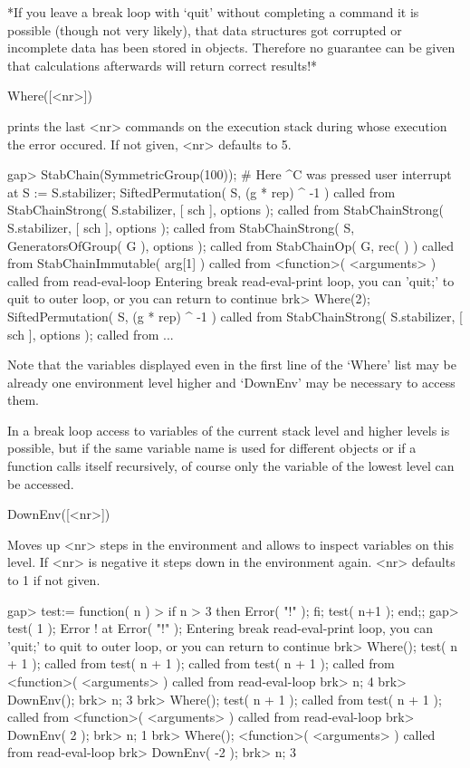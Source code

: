*If you leave a break loop with `quit' without completing a command it
is possible (though not very likely), that data structures got corrupted
or incomplete data has been stored in objects. Therefore no guarantee can be
given that calculations afterwards will return correct results!*

\>Where([<nr>])

prints the last <nr> commands on the execution stack during whose execution
the error occured. If not given, <nr> defaults to 5.

\begintt
gap> StabChain(SymmetricGroup(100));
# Here ^C was pressed
user interrupt at
S := S.stabilizer;
SiftedPermutation( S, (g * rep) ^ -1 ) called from
StabChainStrong( S.stabilizer, [ sch ], options ); called from
StabChainStrong( S.stabilizer, [ sch ], options ); called from
StabChainStrong( S, GeneratorsOfGroup( G ), options ); called from
StabChainOp( G, rec(
     ) ) called from
StabChainImmutable( arg[1] ) called from
<function>( <arguments> ) called from read-eval-loop
Entering break read-eval-print loop, you can 'quit;' to quit to outer loop,
or you can return to continue
brk> Where(2);
SiftedPermutation( S, (g * rep) ^ -1 ) called from
StabChainStrong( S.stabilizer, [ sch ], options ); called from
...
\endtt

Note that the variables displayed even in the first line of the `Where' list
may be already one environment level higher and `DownEnv' may be necessary
to access them.


In a break loop access to variables of the current stack level and higher
levels is possible, but if the same variable name is used for different
objects or if a function calls itself recursively, of course only the
variable of the lowest level can be accessed.

\>DownEnv([<nr>])

Moves up <nr> steps in the environment and allows to inspect variables on
this level. If <nr> is negative it steps down in the environment again. <nr>
defaults to 1 if not given.

\begintt
gap> test:= function( n )
>    if n > 3 then Error( "!" ); fi; test( n+1 ); end;;
gap> test( 1 );
Error ! at
Error( "!" );
Entering break read-eval-print loop,
you can 'quit;' to quit to outer loop,
or you can return to continue
brk> Where();
test( n + 1 ); called from
test( n + 1 ); called from
test( n + 1 ); called from
<function>( <arguments> ) called from read-eval-loop
brk> n;
4
brk> DownEnv();
brk> n;
3
brk> Where();
test( n + 1 ); called from
test( n + 1 ); called from
<function>( <arguments> ) called from read-eval-loop
brk> DownEnv( 2 );
brk> n;
1
brk> Where();
<function>( <arguments> ) called from read-eval-loop
brk> DownEnv( -2 );
brk> n;
3
\endtt

